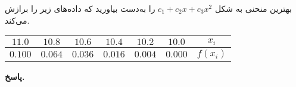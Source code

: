 بهترین منحنی به شکل 
\(c_1+c_2x+c_3x^2\)
را به‌دست بیاورید که داده‌های زیر را برازش می‌کند.
\begin{center}
	\begin{tabular}{cccccc|c}
	\(11.0\)	& \(10.8\)& \(10.6\) &\(10.4\)&\(10.2\) & \(10.0\) & \(x_i\)\\
		\hline
	\(0.100\)&	\(0.064\)& \(0.036\) & \(0.016\) & \(0.004\) &\( 0.000\) & \(f(x_i)\)
	\end{tabular}
\end{center}


\begin{answer}

	\textbf{پاسخ.}
	
\end{answer}
